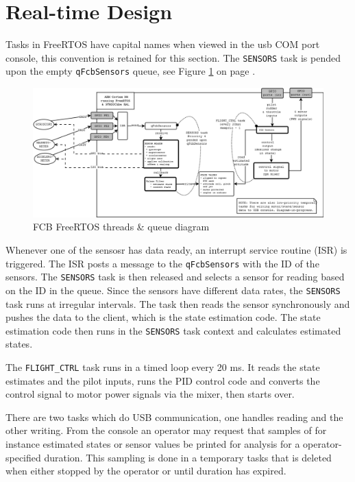 \documentclass[a4paper]{report}
\begin{document}
	\section{Real-time Design}
	\label{sec:real-time-design}
Tasks in FreeRTOS have capital names when viewed in the usb COM port console, this convention is retained for this section. The \texttt{SENSORS} task is pended upon the empty \texttt{qFcbSensors} queue, see Figure \ref{fig:freertos-threads-queues-diag} on page \pageref{fig:freertos-threads-queues-diag}.
\begin{figure}[h]
    \centering
    \includegraphics[scale=0.29]{images/FcbThreadsOverview.png}
    \caption{FCB FreeRTOS threads \& queue diagram}
    \label{fig:freertos-threads-queues-diag}
\end{figure}
Whenever one of the sensosr has data ready, an interrupt service routine (ISR) is triggered. The ISR posts a message to the \texttt{qFcbSensors} with the ID of the sensors. The \texttt{SENSORS} task is then released and selects a sensor for reading based on the ID in the queue. Since the sensors have different data rates, the \texttt{SENSORS} task runs at irregular intervals. The task then reads the sensor synchronously and pushes the data to the client, which is the state estimation code. The state estimation code then runs in the \texttt{SENSORS} task context and calculates estimated states.

The \texttt{FLIGHT\_CTRL} task runs in a timed loop every 20 ms. It reads the state estimates and the pilot inputs, runs the PID control code and converts the control signal to motor power signals via the mixer, then starts over.

There are two tasks which do USB communication, one handles reading and the other writing. From the console an operator may request that samples of for instance estimated states or sensor values be printed for analysis for a operator-specified duration. This sampling is done in a temporary tasks that is deleted when either stopped by the operator or until duration has expired.
\end{document}
